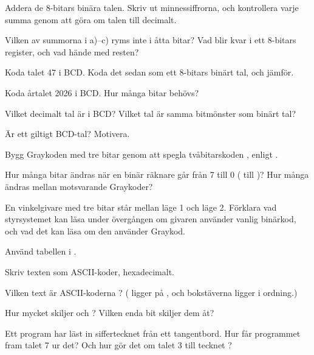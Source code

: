 \label{c1:ex:7}
Addera de 8-bitars binära talen. Skriv ut minnessiffrorna, och kontrollera varje summa genom att
göra om talen till decimalt.
\begin{parts}
  \item {}
  \item {}
  \item {}
  \item Vilken av summorna i a)--c) ryms inte i åtta bitar? Vad blir kvar i ett 8-bitars register,
    och vad hände med resten?
\end{parts}

\label{c1:ex:8}
\begin{parts}
  \item Koda talet 47 i BCD. Koda det sedan som ett 8-bitars binärt tal, och jämför.
  \item Koda årtalet 2026 i BCD. Hur många bitar behövs?
  \item Vilket decimalt tal är  i BCD? Vilket tal är samma bitmönster som binärt
    tal?
  \item Är  ett giltigt BCD-tal? Motivera.
\end{parts}

\label{c1:ex:9}
\begin{parts}
  \item Bygg Graykoden med tre bitar genom att spegla tvåbitarskoden , enligt
    .
  \item Hur många bitar ändras när en binär räknare går från 7 till 0 ( till
    )? Hur många ändras mellan motsvarande Graykoder?
  \item En vinkelgivare med tre bitar står mellan läge 1 och läge 2. Förklara vad styrsystemet kan
    läsa under övergången om givaren använder vanlig binärkod, och vad det kan läsa om den
    använder Graykod.
\end{parts}

\label{c1:ex:10}
Använd tabellen i .
\begin{parts}
  \item Skriv texten  som ASCII-koder, hexadecimalt.
  \item Vilken text är ASCII-koderna ? ( ligger på , och
    bokstäverna ligger i ordning.)
  \item Hur mycket skiljer  och ? Vilken enda bit skiljer dem åt?
  \item Ett program har läst in siffertecknet  från ett tangentbord. Hur får programmet
    fram talet 7 ur det? Och hur gör det om talet 3 till tecknet ?
\end{parts}

